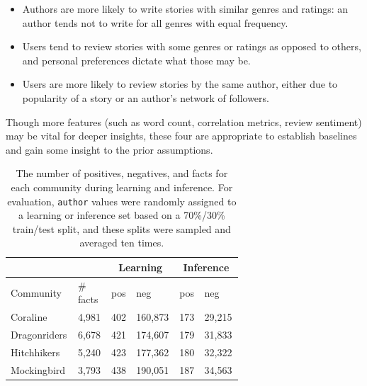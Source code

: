 \documentclass[letterpaper]{article}
\begin{document}
\begin{itemize}
    \item Authors are more likely to write stories with similar genres and ratings: an author tends not to write for all genres with equal frequency.
    \item Users tend to review stories with some genres or ratings as opposed to others, and personal preferences dictate what those may be.
    \item Users are more likely to review stories by the same author, either due to popularity of a story or an author's network of followers.
\end{itemize}

Though more features (such as word count, correlation metrics, review sentiment) may be vital for deeper insights, these four are appropriate to establish baselines and gain some insight to the prior assumptions.






\begin{table}
\centering

    \begin{tabular}{|p{0.2\linewidth} p{0.13\linewidth}|p{0.03\linewidth} p{0.13\linewidth}|p{0.03\linewidth} p{0.13\linewidth}|}
    \hline
    & & \multicolumn{2}{|c|}{Learning} & \multicolumn{2}{|c|}{Inference} \\
    \hline
         Community & \# facts & pos & neg & pos & neg \\
         \hline
         Coraline & 4,981 & 402 & 160,873 & 173 & 29,215 \\
         Dragonriders & 6,678 & 421 & 174,607 & 179 & 31,833 \\
         Hitchhikers & 5,240 & 423 & 177,362 & 180 & 32,322 \\
         Mockingbird & 3,793 & 438 & 190,051 & 187 & 34,563 \\
    \hline
    \end{tabular}

    \caption{The number of positives, negatives, and facts for each community during learning and inference. For evaluation, \texttt{author} values were randomly assigned to a learning or inference set based on a 70\%/30\% train/test split, and these splits were sampled and averaged ten times.}
    \label{tab:data_overview}
\end{table}
\end{document}
